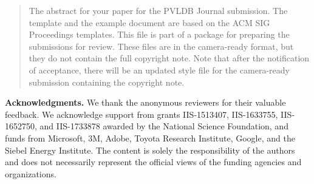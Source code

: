 \documentclass{vldb}
\newcommand{\stitle}[1]{\par\noindent\textbf{#1}}
\begin{document}
\begin{abstract}
The abstract for your paper for the PVLDB Journal submission.
The template and the example document are based on the ACM SIG Proceedings  templates. This file is part of a package for preparing the submissions for review. These files are in the camera-ready format, but they do not contain the full copyright note.
Note that after the notification of acceptance, there will be an updated style file for the camera-ready submission containing the copyright note.
\end{abstract}





\balance

\medskip
\stitle{Acknowledgments.} We thank the anonymous reviewers for their valuable feedback. We acknowledge support from grants IIS-1513407, IIS-1633755, IIS-1652750, and IIS-1733878 awarded by the National Science Foundation, and funds from Microsoft, 3M, Adobe, Toyota Research Institute, Google, and the Siebel Energy Institute. The content is solely the responsibility of the authors and does not necessarily represent the official views of the funding agencies and organizations.

\end{document}
